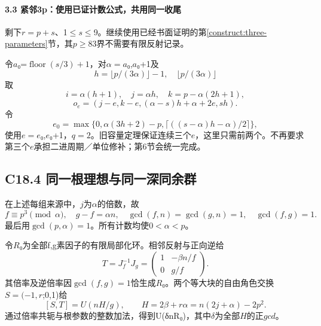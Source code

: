 \paragraph*{\texorpdfstring{{3.3} {紧邻3p：使用已证计数公式，共用同一收尾}}{3.3 紧邻3p：使用已证计数公式，共用同一收尾}}\label{C18-h134}

{剩下\ensuremath{r=p+s}、1\ensuremath{\le}\ensuremath{s}\ensuremath{\le}9。继续使用已经书面证明的}第\ref{construct:three-parameters}节{，其\ensuremath{p}\ensuremath{\ge}83界不需要有限反射记录。}

{令\ensuremath{a}₀=\ensuremath{\operatorname{floor}(s/3)+1}，对\ensuremath{\alpha =a}₀,\ensuremath{a}₀+1及} \[
h=\lfloor p/(3\alpha)\rfloor-1,\quad\lfloor p/(3\alpha)\rfloor
\] {取} \[
i=\alpha(h+1),\quad j=\alpha h,\quad k=p-\alpha(2h+1),
\] \[
o_e=(j-e,k-e,(\alpha-s)h+\alpha+2e,sh).
\tag{C18.3.7}
\] {令} \[
e_0=\max\{0,\alpha(3h+2)-p,\lceil((s-\alpha)h-\alpha)/2\rceil\},
\] {使用\ensuremath{e=e}₀,\ensuremath{e}₀+1，\ensuremath{q=2}。旧容量定理保证连续三个\ensuremath{e}，这里只需前两个。不再要求第三个\ensuremath{e}承担二进周期／单位修补；第6节会统一完成。}

\subsection*{\texorpdfstring{{C18.4} {同一根理想与同一深同余群}}{C18.4 同一根理想与同一深同余群}}\label{C18-h135}

{在上述每组来源中，\ensuremath{j}为\ensuremath{\alpha }的倍数，故} \[
f\equiv p^3\pmod\alpha,\quad
g-f=\alpha n,\quad
\gcd(f,n)=\gcd(g,n)=1,
\quad\gcd(f,g)=1.
\] {最后用\ensuremath{\operatorname{gcd}(p,\alpha )=1}。所有计数均使\ensuremath{0<\alpha <p}。}

{令\ensuremath{R}₀为全部f,g素因子的有限局部化环。相邻反射与正向逆给} \[
T=J_f^{-1}J_g=
\begin{pmatrix}1&-\beta n/f\\0&g/f\end{pmatrix}.
\] {其倍率及逆倍率因\ensuremath{\operatorname{gcd}(f,g)=1}恰生成\ensuremath{R}₀。两个等大块的自由角色交换\ensuremath{S=(-1,r};0,1)给} \[
\boxed{[S,T]=U(nH/g),\qquad
H=2\beta+r\alpha=n(2j+\alpha)-2p^2.}
\tag{C18.4.1}
\] {通过倍率共轭与根参数的整数加法，得到U(δnR₀)，其中\ensuremath{\delta }为全部\ensuremath{H}的正\ensuremath{gcd}。}


